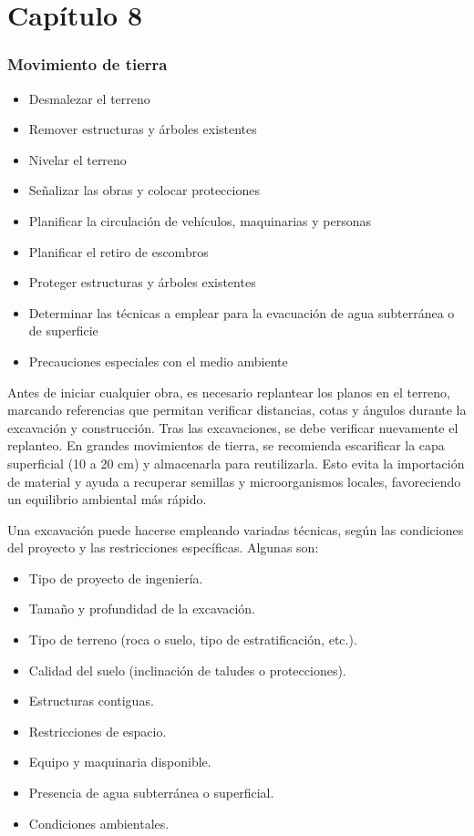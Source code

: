 \part*{Capítulo 8}

\section{Movimiento de tierra}
\begin{itemize}
    \item Desmalezar el terreno
    \item Remover estructuras y árboles existentes
    \item Nivelar el terreno
    \item Señalizar las obras y colocar protecciones
    \item Planificar la circulación de vehículos, maquinarias y personas
    \item Planificar el retiro de escombros
    \item Proteger estructuras y árboles existentes
    \item Determinar las técnicas a emplear para la evacuación de agua subterránea o de superficie
    \item Precauciones especiales con el medio ambiente
\end{itemize}

Antes de iniciar cualquier obra, es necesario replantear los planos en el terreno, marcando referencias que permitan verificar distancias, cotas y ángulos durante la excavación y construcción. Tras las excavaciones, se debe verificar nuevamente el replanteo. En grandes movimientos de tierra, se recomienda escarificar la capa superficial (10 a 20 cm) y almacenarla para reutilizarla. Esto evita la importación de material y ayuda a recuperar semillas y microorganismos locales, favoreciendo un equilibrio ambiental más rápido.

Una excavación puede hacerse empleando variadas técnicas, según las condiciones del proyecto y las restricciones específicas. Algunas son:
\begin{itemize}
    \item Tipo de proyecto de ingeniería.
    \item Tamaño y profundidad de la excavación.
    \item Tipo de terreno (roca o suelo, tipo de estratificación, etc.).
    \item Calidad del suelo (inclinación de taludes o protecciones).
    \item Estructuras contiguas.
    \item Restricciones de espacio.
    \item Equipo y maquinaria disponible.
    \item Presencia de agua subterránea o superficial.
    \item Condiciones ambientales.
\end{itemize}

